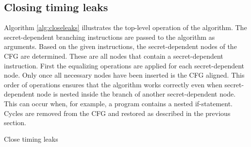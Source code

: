 \subsection{Closing timing leaks}
Algorithm \ref{alg:closeleaks} illustrates the top-level operation of the algorithm. 
The secret-dependent branching instructions are passed to the algorithm as arguments. 
Based on the given instructions, the secret-dependent nodes of the CFG are determined. 
These are all nodes that contain a secret-dependent instruction. 
First the equalizing operations are applied for each secret-dependent node. 
Only once all necessary nodes have been inserted is the CFG aligned.
This order of operations ensures that the algorithm works correctly even when secret-dependent node is nested inside the branch of another secret-dependent node. 
This can occur when, for example, a program contains a nested if-statement. Cycles are removed from the CFG and restored as described in the previous section.


\begin{algorithm*}
    \SetAlgoLined
    \DontPrintSemicolon
    
    
    
    
    \caption{Close timing leaks}
    \label{alg:closeleaks}
\end{algorithm*}

